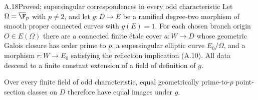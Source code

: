 \begin{claim}{A.18}{Proved; supersingular correspondences in every odd characteristic}
Let $\Omega=\overline{\F}_p$ with $p\ne2$, and let
$g:D\to E$ be a ramified degree-two morphism of smooth proper
connected curves with $g(E)=1$. For each chosen branch origin
$O\in E(\Omega)$ there are a connected finite \'etale cover
$a:W\to D$ whose geometric Galois closure has order prime
to $p$, a supersingular elliptic curve $E_0/\Omega$, and a
morphism $r:W\to E_0$ satisfying the reflection implication
(A.10). All data descend to a finite constant extension of
a field of definition of $g$.

Over every finite field of odd characteristic, equal
geometrically prime-to-$p$ point-section classes on $D$
therefore have equal images under $g$.
\end{claim}
